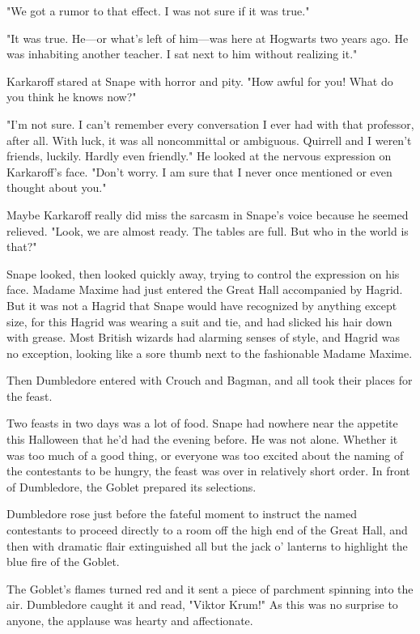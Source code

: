 "We got a rumor to that effect. I was not sure if it was true."

"It was true. He—or what's left of him—was here at Hogwarts two years ago. He was inhabiting another teacher. I sat next to him without realizing it."

Karkaroff stared at Snape with horror and pity. "How awful for you! What do you think he knows now?"

"I'm not sure. I can't remember every conversation I ever had with that professor, after all. With luck, it was all noncommittal or ambiguous. Quirrell and I weren't friends, luckily. Hardly even friendly." He looked at the nervous expression on Karkaroff's face. "Don't worry. I am sure that I never once mentioned or even thought about you."

Maybe Karkaroff really did miss the sarcasm in Snape's voice because he seemed relieved. "Look, we are almost ready. The tables are full. But who in the world is that?"

Snape looked, then looked quickly away, trying to control the expression on his face. Madame Maxime had just entered the Great Hall accompanied by Hagrid. But it was not a Hagrid that Snape would have recognized by anything except size, for this Hagrid was wearing a suit and tie, and had slicked his hair down with grease. Most British wizards had alarming senses of style, and Hagrid was no exception, looking like a sore thumb next to the fashionable Madame Maxime.

Then Dumbledore entered with Crouch and Bagman, and all took their places for the feast.

Two feasts in two days was a lot of food. Snape had nowhere near the appetite this Halloween that he'd had the evening before. He was not alone. Whether it was too much of a good thing, or everyone was too excited about the naming of the contestants to be hungry, the feast was over in relatively short order. In front of Dumbledore, the Goblet prepared its selections.

Dumbledore rose just before the fateful moment to instruct the named contestants to proceed directly to a room off the high end of the Great Hall, and then with dramatic flair extinguished all but the jack o' lanterns to highlight the blue fire of the Goblet.

The Goblet's flames turned red and it sent a piece of parchment spinning into the air. Dumbledore caught it and read, "Viktor Krum!" As this was no surprise to anyone, the applause was hearty and affectionate.

